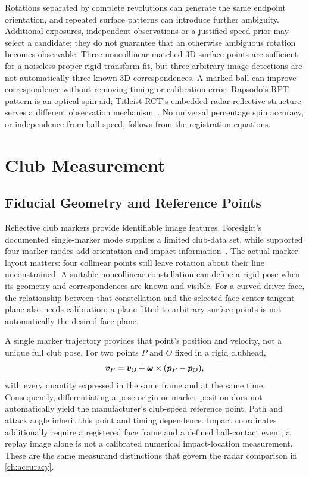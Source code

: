Rotations separated by complete revolutions can generate the same endpoint orientation, and repeated surface patterns can introduce further ambiguity.
Additional exposures, independent observations or a justified speed prior may select a candidate; they do not guarantee that an otherwise ambiguous rotation becomes observable.
Three noncollinear matched 3D surface points are sufficient for a noiseless proper rigid-transform fit, but three arbitrary image detections are not automatically three known 3D correspondences.
A marked ball can improve correspondence without removing timing or calibration error.
Rapsodo's RPT pattern is an optical spin aid; Titleist RCT's embedded radar-reflective structure serves a different observation mechanism~\cite{rapsodofaq,garminr10rct}.
No universal percentage spin accuracy, or independence from ball speed, follows from the registration equations.

\section{Club Measurement}
\label{sec:camclub}

\subsection{Fiducial Geometry and Reference Points}

Reflective club markers provide identifiable image features.
Foresight's documented single-marker mode supplies a limited club-data set, while supported four-marker modes add orientation and impact information~\cite{foresightmarkers,foresightquadmanual}.
The actual marker layout matters: four collinear points still leave rotation about their line unconstrained.
A suitable noncollinear constellation can define a rigid pose when its geometry and correspondences are known and visible.
For a curved driver face, the relationship between that constellation and the selected face-center tangent plane also needs calibration; a plane fitted to arbitrary surface points is not automatically the desired face plane.

A single marker trajectory provides that point's position and velocity, not a unique full club pose.
For two points $P$ and $O$ fixed in a rigid clubhead,
\begin{equation}
\bm{v}_P=\bm{v}_O+\bm{\omega}\times(\bm{p}_P-\bm{p}_O),
\end{equation}
with every quantity expressed in the same frame and at the same time.
Consequently, differentiating a pose origin or marker position does not automatically yield the manufacturer's club-speed reference point.
Path and attack angle inherit this point and timing dependence.
Impact coordinates additionally require a registered face frame and a defined ball-contact event; a replay image alone is not a calibrated numerical impact-location measurement.
These are the same measurand distinctions that govern the radar comparison in \cref{ch:accuracy}.

